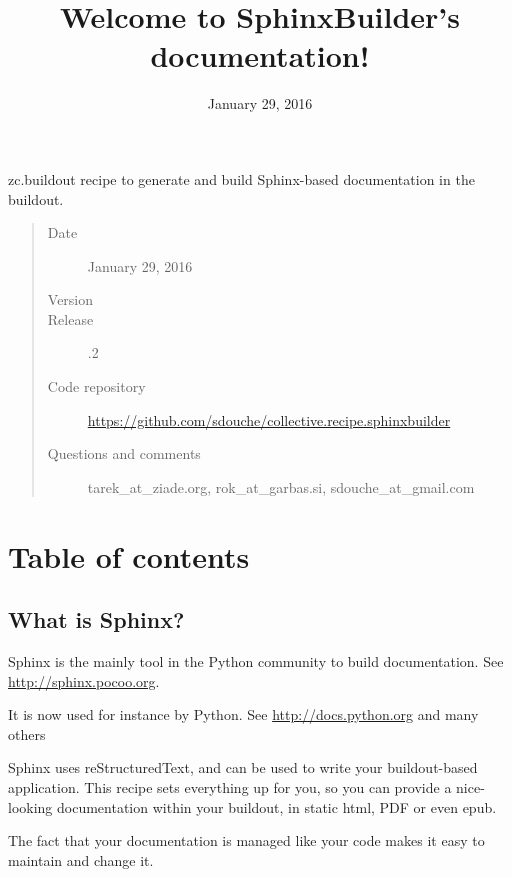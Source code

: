 \documentclass[letterpaper,10pt,english]{sphinxmanual}
\title{Welcome to SphinxBuilder's documentation!}
\date{January 29, 2016}
\author{}
\begin{document}
\maketitle
\tableofcontents
{}\label{index::doc}


zc.buildout recipe to generate and build Sphinx-based documentation in the buildout.
\begin{quote}\begin{description}
\item[{Date}] \leavevmode
January 29, 2016

\item[{Version}] 

\item[{Release}] .2

\item[{Code repository}] \leavevmode
\href{https://github.com/sdouche/collective.recipe.sphinxbuilder}{https://github.com/sdouche/collective.recipe.sphinxbuilder}

\item[{Questions and comments}] \leavevmode
tarek\_at\_ziade.org, rok\_at\_garbas.si, sdouche\_at\_gmail.com

\end{description}\end{quote}


\chapter{Table of contents}
\label{index:welcome-to-sphinxbuilder-s-documentation}\label{index:table-of-contents}

\section{What is Sphinx?}
\label{about_sphinx:what-is-sphinx}\label{about_sphinx::doc}
Sphinx is the mainly tool in the Python community to build documentation. See
\href{http://sphinx.pocoo.org}{http://sphinx.pocoo.org}.

It is now used for instance by Python. See \href{http://docs.python.org}{http://docs.python.org} and many
others

Sphinx uses reStructuredText, and can be used to write your buildout-based
application. This recipe sets everything up for you, so you can provide a
nice-looking documentation within your buildout, in static html, PDF or even
epub.

The fact that your documentation is managed like your code makes it easy to
maintain and change it.
\end{document}

